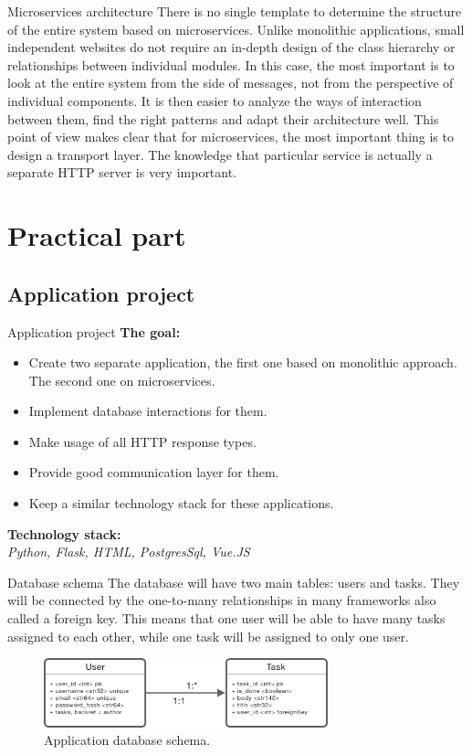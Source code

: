 \documentclass{beamer}
\begin{document}
	\begin{frame}{Microservices architecture}
		There is no single template to determine the structure of the entire system based on microservices. Unlike monolithic applications, small independent websites do not require an in-depth design of the class hierarchy or relationships between individual modules. In this case, the most important is to look at the entire system from the side of messages, not from the perspective of individual components. It is then easier to analyze the ways of interaction between them, find the right patterns and adapt their architecture well. This point of view makes clear that for microservices, the most important thing is to design a transport layer. The knowledge that particular service is actually a separate HTTP server is very important.
	\end{frame}
	
	\section{Practical part}
	\subsection{Application project}
	\begin{frame}{Application project}
		\textbf{The goal:}
		\begin{itemize}
		  \item Create two separate application, the first one based on monolithic approach. The second one on microservices.
		  \item Implement database interactions for them.
		  \item Make usage of all HTTP response types.
		  \item Provide good communication layer for them.
		  \item Keep a similar technology stack for these applications.
		\end{itemize}
		\textbf{Technology stack:} \\
		\textit{Python, Flask, HTML, PostgresSql, Vue.JS}
	\end{frame}
	
	\begin{frame}{Database schema}
		The database will have two main tables: users and tasks. They will be connected by the one-to-many relationships in many frameworks also called a foreign key. This means that one user will be able to have many tasks assigned to each other, while one task will be assigned to only one user.
		\begin{figure}[h!]
			\centering
			\includegraphics[height=2cm]{Pictures/databaseSchema}
			\caption{Application database schema.}	
			\label{fig:architekturaTroj}
		\end{figure}
	\end{frame}
	
\end{document}
